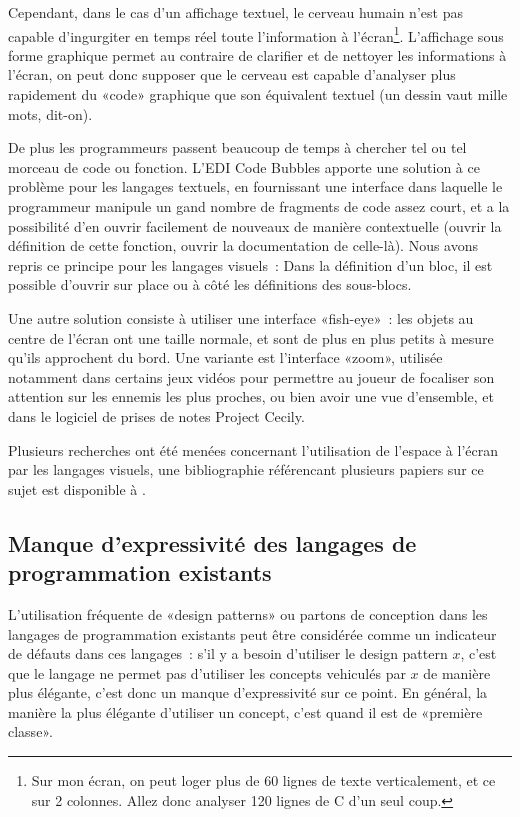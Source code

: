 \documentclass{article}
\begin{document}
Cependant, dans le cas d'un affichage textuel, le cerveau humain n'est pas capable d'ingurgiter en temps réel toute l'information à
l'écran\footnote{Sur mon écran, on peut loger plus de 60 lignes de texte verticalement, et ce sur 2 colonnes. Allez donc analyser 120 lignes
  de C d'un seul coup.}. L'affichage sous forme graphique permet au contraire de clarifier et de nettoyer les informations à l'écran, on
peut donc supposer que le cerveau est capable d'analyser plus rapidement du «code» graphique que son équivalent textuel (un dessin vaut
mille mots, dit-on).

De plus les programmeurs passent beaucoup de temps à chercher tel ou tel morceau de code ou fonction. L'EDI Code Bubbles\cite{code-bubbles}
apporte une solution à ce problème pour les langages textuels, en fournissant une interface dans laquelle le programmeur manipule un gand
nombre de fragments de code assez court, et a la possibilité d'en ouvrir facilement de nouveaux de manière contextuelle (ouvrir la
définition de cette fonction, ouvrir la documentation de celle-là). Nous avons repris ce principe pour les langages visuels~: Dans la
définition d'un bloc, il est possible d'ouvrir sur place ou à côté les définitions des sous-blocs.

Une autre solution consiste à utiliser une interface «fish-eye»~: les objets au centre de l'écran ont une taille normale, et sont de plus en
plus petits à mesure qu'ils approchent du bord. Une variante est l'interface «zoom», utilisée notamment dans certains jeux
vidéos\cite{mutant-storm} pour permettre au joueur de focaliser son attention sur les ennemis les plus proches, ou bien avoir une vue
d'ensemble, et dans le logiciel de prises de notes Project Cecily\cite{project-cecily}.

Plusieurs recherches ont été menées concernant l'utilisation de l'espace à l'écran par les langages visuels, une bibliographie référencant
plusieurs papiers sur ce sujet est disponible à \cite{biblio-vpl-a-screen-real-estate}.


\subsection[Manque d'expressivité]{Manque d'expressivité des langages de programmation existants}

L'utilisation fréquente de «design patterns» ou partons de conception dans les langages de programmation existants peut être considérée
comme un indicateur de défauts dans ces langages\cite{design-patterns-failure}~: s'il y a besoin d'utiliser le design pattern $x$, c'est
que le langage ne permet pas d'utiliser les concepts vehiculés par $x$ de manière plus élégante, c'est donc un manque d'expressivité sur ce
point. En général, la manière la plus élégante d'utiliser un concept, c'est quand il est de «première classe».
\end{document}
